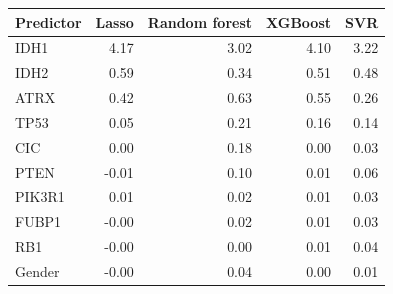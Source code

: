 \begin{tabular}{lrrrr}
\toprule
\textbf{Predictor} & \textbf{Lasso} & \textbf{Random forest} & \textbf{XGBoost} & \textbf{SVR} \\
\midrule
IDH1 & 4.17 & 3.02 & 4.10 & 3.22 \\
IDH2 & 0.59 & 0.34 & 0.51 & 0.48 \\
ATRX & 0.42 & 0.63 & 0.55 & 0.26 \\
TP53 & 0.05 & 0.21 & 0.16 & 0.14 \\
CIC & 0.00 & 0.18 & 0.00 & 0.03 \\
PTEN & -0.01 & 0.10 & 0.01 & 0.06 \\
PIK3R1 & 0.01 & 0.02 & 0.01 & 0.03 \\
FUBP1 & -0.00 & 0.02 & 0.01 & 0.03 \\
RB1 & -0.00 & 0.00 & 0.01 & 0.04 \\
Gender & -0.00 & 0.04 & 0.00 & 0.01 \\
\bottomrule
\end{tabular}
